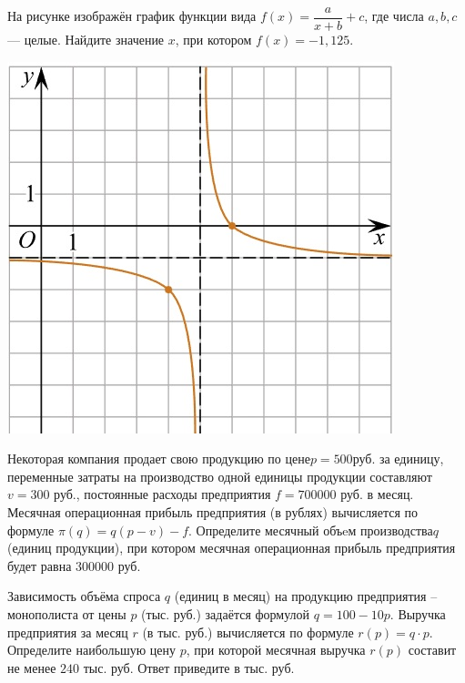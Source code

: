 \begin{class}[number=6]
\begin{listofex}
\begin{minipage}[c]{0.25\textwidth}
		\end{minipage}
		\item
		\begin{minipage}[t]{0.67\textwidth}
			На рисунке изображён график функции вида \(f(x)=\dfrac{a}{x+b}+c\), где числа \(a, b, c\) --- целые. Найдите значение \(x\), при котором \(f(x)=-1,125\).
		\end{minipage}
		\begin{minipage}[c]{0.25\textwidth}
			\includegraphics[align=t, width=\textwidth]{pics/G101M4C6-4.jpg}
		\end{minipage}
		\item Некоторая компания продает свою продукцию по цене\(  p=500  \)руб. за единицу, переменные затраты на производство одной единицы продукции составляют  \( v=300 \) руб., постоянные расходы предприятия \( f=700000 \) руб. в месяц. Месячная операционная прибыль предприятия (в рублях) вычисляется по формуле  \( \pi(q)=q(p-v)-f \). Определите месячный объeм производства\(  q \) (единиц продукции), при котором месячная операционная прибыль предприятия будет равна \( 300000 \) руб.
		\item Зависимость объёма спроса \( q \) (единиц в месяц) на продукцию предприятия – монополиста от цены \( p \) (тыс. руб.) задаётся формулой \( q=100-10p \). Выручка предприятия за месяц \( r \) (в тыс. руб.) вычисляется по формуле \( r(p)=q\cdot p \). Определите наибольшую цену \( p \), при которой месячная выручка \( r(p) \) составит не менее \( 240 \) тыс. руб. Ответ приведите в тыс. руб.

\end{listofex}
\end{class}
